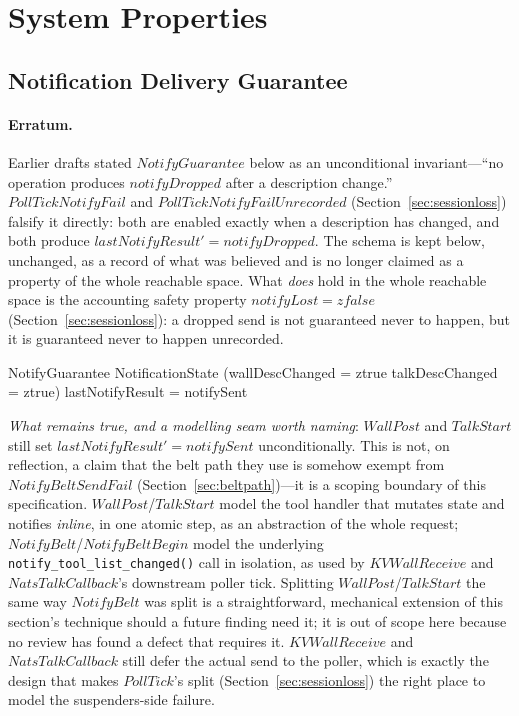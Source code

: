 \documentclass[a4paper,10pt,fleqn]{article}
\begin{document}
\section{System Properties}

\subsection{Notification Delivery Guarantee}

\paragraph{Erratum.}  Earlier drafts stated $NotifyGuarantee$ below as
an unconditional invariant---``no operation produces $notifyDropped$
after a description change.''  $PollTickNotifyFail$ and
$PollTickNotifyFailUnrecorded$ (Section~\ref{sec:sessionloss})
falsify it directly: both are enabled exactly when a description has
changed, and both produce $lastNotifyResult' = notifyDropped$.  The
schema is kept below, unchanged, as a record of what was believed and
is no longer claimed as a property of the whole reachable space.  What
\emph{does} hold in the whole reachable space is the accounting safety
property $notifyLost = zfalse$ (Section~\ref{sec:sessionloss}): a
dropped send is not guaranteed never to happen, but it is guaranteed
never to happen unrecorded.

\begin{schema}{NotifyGuarantee}
  NotificationState
  \where
  (wallDescChanged = ztrue \lor talkDescChanged = ztrue)
  \implies lastNotifyResult = notifySent
\end{schema}

\emph{What remains true, and a modelling seam worth naming}: $WallPost$
and $TalkStart$ still set $lastNotifyResult' = notifySent$
unconditionally.  This is not, on reflection, a claim that the belt
path they use is somehow exempt from $NotifyBeltSendFail$
(Section~\ref{sec:beltpath})---it is a scoping boundary of this
specification.  $WallPost$/$TalkStart$ model the tool handler that
mutates state and notifies \emph{inline}, in one atomic step, as an
abstraction of the whole request; $NotifyBelt$/$NotifyBeltBegin$ model
the underlying \texttt{notify\_tool\_list\_changed()} call in isolation,
as used by $KVWallReceive$ and $NatsTalkCallback$'s downstream poller
tick.  Splitting $WallPost$/$TalkStart$ the same way $NotifyBelt$ was
split is a straightforward, mechanical extension of this section's
technique should a future finding need it; it is out of scope here
because no review has found a defect that requires it.  $KVWallReceive$
and $NatsTalkCallback$ still defer the actual send to the poller, which
is exactly the design that makes $PollTick$'s split
(Section~\ref{sec:sessionloss}) the right place to model the
suspenders-side failure.
\end{document}
